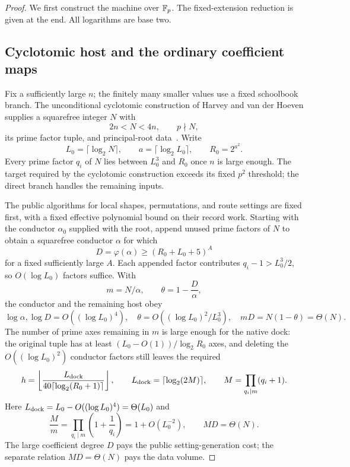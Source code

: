 \begin{proof}
We first construct the machine over $\mathbb F_p$.  The fixed-extension reduction
is given at the end.  All logarithms are base two.

\subsection{Cyclotomic host and the ordinary coefficient maps}
\label{upd:host}

Fix a sufficiently large $n$; the finitely many smaller values use a fixed
schoolbook branch.  The unconditional cyclotomic construction of Harvey and
van der Hoeven supplies a squarefree integer $N$ with
\[
  2n<N<4n,\qquad p\nmid N,
\]
its prime factor tuple, and principal-root data~\cite{HVH19Cyclo}.  Write
\[
  L_0=\lceil\log_2 N\rceil,\qquad
  a=\lceil\log_2 L_0\rceil,\qquad R_0=2^{a^2}.
\]
Every prime factor $q_i$ of $N$ lies between $L_0^3$ and $R_0$ once $n$ is
large enough.  The target required by the cyclotomic construction exceeds
its fixed $p^2$ threshold; the direct branch handles the remaining inputs.

The public algorithms for local shapes, permutations, and route settings
are fixed first, with a fixed effective polynomial bound on their record
work.  Starting with the conductor $\alpha_0$ supplied with the root, append
unused prime factors of $N$ to obtain a squarefree conductor $\alpha$ for
which
\[
  D=\varphi(\alpha)\geq (R_0+L_0+5)^A
\]
for a fixed sufficiently large $A$.  Each appended factor contributes
$q_i-1>L_0^3/2$, so $O(\log L_0)$ factors suffice.  With
\[
  m=N/\alpha,\qquad
  \theta=1-\frac{D}{\alpha},
\]
the conductor and the remaining host obey
\begin{equation}
\label{upd:host-shape}
  \log\alpha,\log D=O((\log L_0)^4),\quad
  \theta=O((\log L_0)^2/L_0^3),\quad
  mD=N(1-\theta)=\Theta(N).
\end{equation}
The number of prime axes remaining in $m$ is large enough for the native
dock: the original tuple has at least
$(L_0-O(1))/\log_2 R_0$ axes, and deleting the $O((\log L_0)^2)$ conductor
factors still leaves the required
\[
  h=\left\lfloor
       \frac{L_{\rm dock}}
            {40\lceil\log_2(R_0+1)\rceil}
     \right\rfloor,
  \qquad
  L_{\rm dock}=\lceil\log_2(2M)\rceil,
  \qquad
  M=\prod_{q_i\mid m}(q_i+1).
\]
Here $L_{\rm dock}=L_0-O((\log L_0)^4)=\Theta(L_0)$ and
\[
  \frac{M}{m}=\prod_{q_i\mid m}\left(1+\frac1{q_i}\right)
       =1+O(L_0^{-2}),\qquad MD=\Theta(N).
\]
The large coefficient degree $D$ pays the public setting-generation cost;
the separate relation $MD=\Theta(N)$ pays the data volume.


\end{proof}

